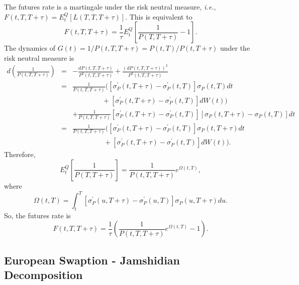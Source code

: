 \documentclass[12pt]{article}
\begin{document}
    The futures rate is a martingale under the risk neutral measure, {\it i.e.}, $F(t,T,T+\tau)=E_t^Q[L(T,T,T+\tau)]$.
    This is equivalent to
    \begin{equation}
      F(t,T,T+\tau)=\frac{1}{\tau}E_t^Q\left[\frac{1}{P(T,T+\tau)}-1\right].
    \end{equation}
    The dynamics of $G(t)=1/P(t,T,T+\tau)=P(t,T)/P(t,T+\tau)$ under the risk neutral measure is
    \begin{eqnarray}
      d\left(\frac{1}{P(t,T,T+\tau)}\right)&=&-\frac{dP(t,T,T+\tau)}{P^2(t,T,T+\tau)}+\frac{\left(dP(t,T,T+\tau)\right)^2}{P^3(t,T,T+\tau)}\nonumber\\
                &=&\frac{1}{P(t,T,T+\tau)}\Big(\left[\sigma_P^{\prime}(t,T+\tau)-\sigma_P^{\prime}(t,T)\right]\sigma_P(t,T)dt\nonumber\\
                && \ \ \ \ \ \ \ \ \ \ \ \ \ \ \  \ \ \ \ +\left[\sigma_P^{\prime}(t,T+\tau)-\sigma_P^{\prime}(t,T)\right]dW(t)\Big)\nonumber\\
                && + \frac{1}{P(t,T,T+\tau)}\left[\sigma_P^{\prime}(t,T+\tau)-\sigma_P^{\prime}(t,T)\right]\left[\sigma_P(t,T+\tau)-\sigma_P(t,T)\right]dt\nonumber\\
                &=&\frac{1}{P(t,T,T+\tau)}\Big(\left[\sigma_P^{\prime}(t,T+\tau)-\sigma_P^{\prime}(t,T)\right]\sigma_P(t,T+\tau)dt\nonumber\\
                && \ \ \ \ \ \ \ \ \ \ \ \ \ \ \ \ \ \ \ \ +\left[\sigma_P^{\prime}(t,T+\tau)-\sigma_P^{\prime}(t,T)\right]dW(t)\Big).
    \end{eqnarray}
    Therefore,
    \begin{equation}
      E_t^Q\left[\frac{1}{P(T,T+\tau)}\right]=\frac{1}{P(t,T,T+\tau)}e^{\Omega(t,T)},
    \end{equation}
    where
    \begin{equation}
      \Omega(t,T)=\int_t^T\left[\sigma_P^{\prime}(u,T+\tau)-\sigma_P^{\prime}(u,T)\right]\sigma_P(u,T+\tau)du.
    \end{equation}
    So, the futures rate is
    \begin{equation}
      F(t,T,T+\tau)=\frac{1}{\tau}\left(\frac{1}{P(t,T,T+\tau)}e^{\Omega(t,T)}-1\right).
    \end{equation}
 
  \subsection{European Swaption - Jamshidian Decomposition}
\end{document}
